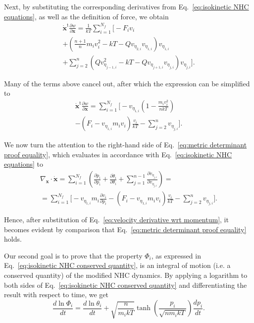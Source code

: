 \documentclass[
aip,
jcp,
reprint,
]{revtex4-1}
\newcommand{\vt}[1]{\boldsymbol{\mathbf{#1}}}          %
\newcommand{\tr}[1]{#1^\text{t}}                       %
\newcommand{\diff}[2]{\frac{\partial #2}{\partial #1}} %
\newcommand{\nn}{n}
\begin{document}
Next, by substituting the corresponding derivatives from Eq.~\eqref{eq:isokinetic NHC equations}, as well as the definition of force, we obtain
\begin{multline*}
\tr{\dot{\vt x}} \diff{\vt x}{w} = \frac{1}{kT} \sum_{i=1}^{N_f} \Bigg[-F_i v_i \\ 
+ \left(\frac{\nn+1}{\nn} m_i v_i^2 - kT - Q v_{\eta_{2, i}} v_{\eta_{1, i}}\right) v_{\eta_{1,i}} \\
+ \sum_{j=2}^\nn \left(Q v_{\eta_{j-1, i}}^2 - kT - Q v_{\eta_{j+1, i}} v_{\eta_{j, i}}\right) v_{\eta_{j,i}} \Bigg].
\end{multline*}

Many of the terms above cancel out, after which the expression can be simplified to
\begin{multline*}
\tr{\dot{\vt x}} \diff{\vt x}{w} = \sum_{i=1}^{N_f} \bigg[- v_{\eta_{1,i}}\left(1 - \frac{m_i v_i^2}{\nn kT}\right) \\
-\left(F_i - v_{\eta_{1,i}} m_i v_i\right) \frac{v_i}{kT} - \sum_{j=2}^\nn v_{\eta_{j,i}} \bigg].
\end{multline*}

We now turn the attention to the right-hand side of Eq.~\eqref{eq:metric determinant proof equality}, which evaluates in accordance with Eq.~\eqref{eq:isokinetic NHC equations} to
\begin{multline*}
\nabla_{\vt x} \cdot \dot{\vt x} = \sum_{i=1}^{N_f} \left(\diff{p_i}{\dot{p}_i} + \diff{\theta_i}{\dot{\theta}_i} + \sum_{j=1}^{\nn-1} \diff{v_{\eta_{j,i}}}{\dot{v}_{\eta_{j,i}}}\right) = \\
= \sum_{i=1}^{N_f} \Bigg[- v_{\eta_{1,i}} m_i \diff{p_i}{v_i} - \left(F_i - v_{\eta_{1,i}} m_i v_i\right) \frac{v_i}{kT} - \sum_{j=2}^\nn v_{\eta_{j,i}} \Bigg].
\end{multline*}

Hence, after substitution of Eq.~\eqref{eq:velocity derivative wrt momentum}, it becomes evident by comparison that Eq.~\eqref{eq:metric determinant proof equality} holds.

Our second goal is to prove that the property $\Phi_i$, as expressed in Eq.~\eqref{eq:isokinetic NHC conserved quantity}, is an integral of motion (i.e. a conserved quantity) of the modified NHC dynamics.
By applying a logarithm to both sides of Eq.~\eqref{eq:isokinetic NHC conserved quantity} and differentiating the result with respect to time, we get
%
\begin{equation}
\frac{d \ln \Phi_i}{dt} = \frac{d \ln \theta_i}{dt} + \sqrt{\frac{\nn}{m_i kT}}  \tanh\left(\frac{p_i}{\sqrt{\nn m_i k T}}\right) \frac{d p_i}{dt}.
\end{equation}
\end{document}

